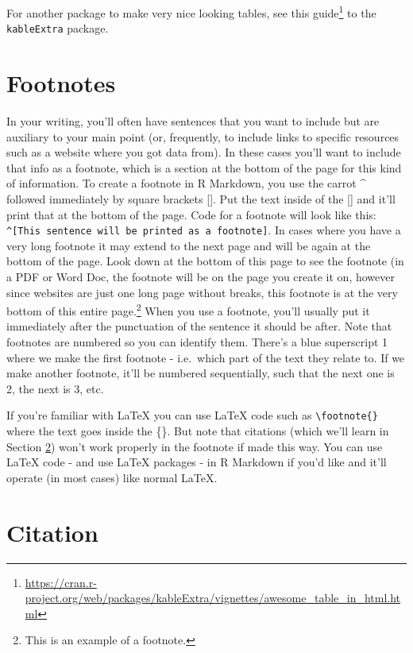\documentclass[
]{krantz}
\renewcommand{\href}[2]{#2\footnote{\url{#1}}}
\begin{document}
For another package to make very nice looking tables, see \href{https://cran.r-project.org/web/packages/kableExtra/vignettes/awesome_table_in_html.html}{this guide} to the \texttt{kableExtra} package.

\hypertarget{footnotes}{%
\section{Footnotes}\label{footnotes}}

In your writing, you'll often have sentences that you want to include but are auxiliary to your main point (or, frequently, to include links to specific resources such as a website where you got data from). In these cases you'll want to include that info as a footnote, which is a section at the bottom of the page for this kind of information. To create a footnote in R Markdown, you use the carrot \^{} followed immediately by square brackets {[}{]}. Put the text inside of the {[}{]} and it'll print that at the bottom of the page. Code for a footnote will look like this: \texttt{\^{}{[}This\ sentence\ will\ be\ printed\ as\ a\ footnote{]}}. In cases where you have a very long footnote it may extend to the next page and will be again at the bottom of the page. Look down at the bottom of this page to see the footnote (in a PDF or Word Doc, the footnote will be on the page you create it on, however since websites are just one long page without breaks, this footnote is at the very bottom of this entire page.\footnote{This is an example of a footnote.} When you use a footnote, you'll usually put it immediately after the punctuation of the sentence it should be after. Note that footnotes are numbered so you can identify them. There's a blue superscript 1 where we make the first footnote - i.e.~which part of the text they relate to. If we make another footnote, it'll be numbered sequentially, such that the next one is 2, the next is 3, etc.

If you're familiar with LaTeX you can use LaTeX code such as \texttt{\textbackslash{}footnote\{\}} where the text goes inside the \{\}. But note that citations (which we'll learn in Section \ref{citation}) won't work properly in the footnote if made this way. You can use LaTeX code - and use LaTeX packages - in R Markdown if you'd like and it'll operate (in most cases) like normal LaTeX.

\hypertarget{citation}{%
\section{Citation}\label{citation}}
\end{document}
